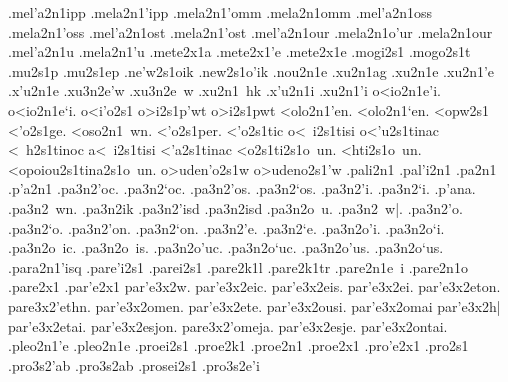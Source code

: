{.mel'a2n1ipp 		%
.mela2n1'ipp
.mela2n1'omm 		%
.mela2n1omm
.mel'a2n1oss 		%
.mela2n1'oss
.mel'a2n1ost 		%
.mela2n1'ost
.mel'a2n1our 		%
.mela2n1o'ur
.mela2n1our  		%
.mel'a2n1u		%
.mela2n1'u
.mete2x1a   		%
.mete2x1'e  		%
.mete2x1e
.mogi2s1    		%
.mogo2s1t    		%
.mu2s1p      		%
.mu2s1ep   		%
.ne'w2s1oik  		%
.new2s1o'ik
.nou2n1e     		%
.xu2n1ag		%
.xu2n1e
.xu2n1'e
.x'u2n1e
	.xu3n2e'w 		%
	.xu3n2e~w
.xu2n1~hk 		%
.x'u2n1i  		%
.xu2n1'i  		%
o<io2n1e'i.		%
o<io2n1e`i.
o<i'o2s1		%
o>i2s1p'wt 		%
o>i2s1pwt
<olo2n1'en.
<olo2n1`en.
<opw2s1			%
<'o2s1ge.               %
<oso2n1~wn.  		%
<'o2s1per.		%
<'o2s1tic 		%
 o<~i2s1tisi		%
 o<'u2s1tinac		%
 <~h2s1tinoc 		%
 a<~i2s1tisi   		%
 <'a2s1tinac 		%
 <o2s1ti2s1o~un.	%
 <hti2s1o~un.  		%
 <opoiou2s1tina2s1o~un.	%
o>uden'o2s1w 		%
o>udeno2s1'w
.pali2n1 		%
.pal'i2n1 		%
.pa2n1
.p'a2n1
	.pa3n2'oc. 		%
	.pa3n2`oc.
	.pa3n2'os.
	.pa3n2`os.
	.pa3n2'i.
	.pa3n2`i.
	.p'ana.
	.pa3n2~wn.
	.pa3n2ik  		%
	.pa3n2'isd 		%
	.pa3n2isd  		%
	.pa3n2o~u. 		%
	.pa3n2~w|.
	.pa3n2'o.
	.pa3n2`o.
	.pa3n2'on.
	.pa3n2`on.
	.pa3n2'e.
	.pa3n2`e.
	.pa3n2o'i.
	.pa3n2o`i.
	.pa3n2o~ic.
	.pa3n2o~is.
	.pa3n2o'uc.
	.pa3n2o`uc.
	.pa3n2o'us.
	.pa3n2o`us.
.para2n1'isq 		%
.pare'i2s1 		%
.parei2s1
.pare2k1l 		%
.pare2k1tr 		%
.pare2n1e~i 		%
.pare2n1o 		%
.pare2x1
.par'e2x1
	par'e3x2w.		%
	par'e3x2eic.
	par'e3x2eis.
	par'e3x2ei.
	par'e3x2eton.
	pare3x2'ethn.
	par'e3x2omen.
	par'e3x2ete.
	par'e3x2ousi.
	par'e3x2omai
	par'e3x2h|
	par'e3x2etai.
	par'e3x2esjon.
	pare3x2'omeja.
	par'e3x2esje.
	par'e3x2ontai.
.pleo2n1'e 		%
.pleo2n1e
.proei2s1 		%
.proe2k1 		%
.proe2n1 		%
.proe2x1 		%
.pro'e2x1 		%
.pro2s1
	.pro3s2'ab 		%
	.pro3s2ab
.prosei2s1 		%
	.pro3s2e'i 		%
}

